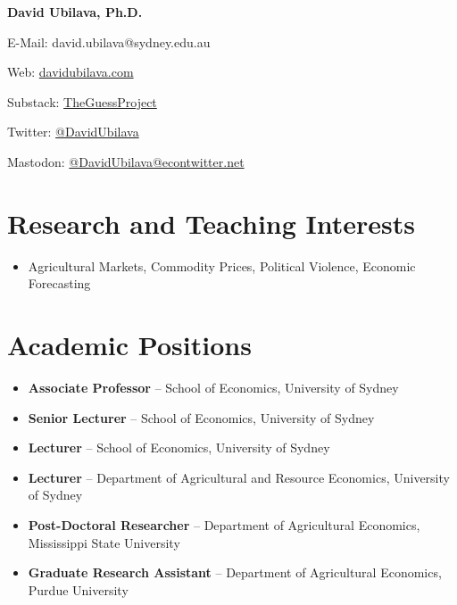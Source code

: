 \documentclass[10pt]{article}
\begin{document}
	
	
	
	\hspace{0.00in}\Large{\bfseries{David Ubilava, Ph.D.}}
	\normalsize
	
	\medskip
	
	{E-Mail: david.ubilava@sydney.edu.au}
	
	\smallskip
	
	{Web: \href{https://davidubilava.com}{davidubilava.com}}
	
	\smallskip
	
	{Substack: \href{https://theguessproject.substack.com}{TheGuessProject}}
	
	\smallskip
	
	{Twitter: \href{https://twitter.com/DavidUbilava}{@DavidUbilava}}
	
	\smallskip
	
	{Mastodon: \href{https://econtwitter.net/@DavidUbilava}{@DavidUbilava@econtwitter.net}}

	\medskip

	
	\section*{Research and Teaching Interests}
	\begin{itemize}
		\item Agricultural Markets, Commodity Prices, Political Violence, Economic Forecasting
	\end{itemize}
	
	\section*{Academic Positions}
	\begin{itemize}
		\item {} \textbf{Associate Professor} -- School of Economics, University of Sydney
		\item {} \textbf{Senior Lecturer} -- School of Economics, University of Sydney
		\item {} \textbf{Lecturer} -- School of Economics, University of Sydney
		\item {} \textbf{Lecturer} -- Department of Agricultural and Resource Economics, University of Sydney
		\item {} \textbf{Post-Doctoral Researcher} -- Department of Agricultural Economics, Mississippi State University
		\item {} \textbf{Graduate Research Assistant} -- Department of Agricultural Economics, Purdue University
	\end{itemize}
	
\end{document}
